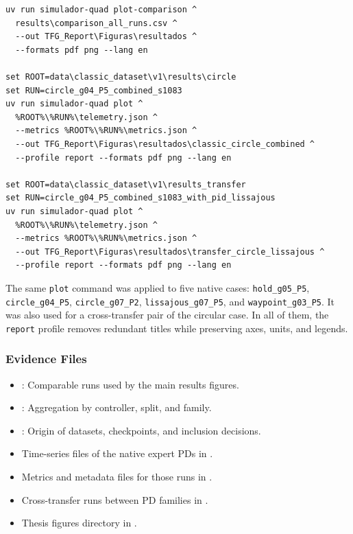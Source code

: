 \begin{verbatim}
uv run simulador-quad plot-comparison ^
  results\comparison_all_runs.csv ^
  --out TFG_Report\Figuras\resultados ^
  --formats pdf png --lang en

set ROOT=data\classic_dataset\v1\results\circle
set RUN=circle_g04_P5_combined_s1083
uv run simulador-quad plot ^
  %ROOT%\%RUN%\telemetry.json ^
  --metrics %ROOT%\%RUN%\metrics.json ^
  --out TFG_Report\Figuras\resultados\classic_circle_combined ^
  --profile report --formats pdf png --lang en

set ROOT=data\classic_dataset\v1\results_transfer
set RUN=circle_g04_P5_combined_s1083_with_pid_lissajous
uv run simulador-quad plot ^
  %ROOT%\%RUN%\telemetry.json ^
  --metrics %ROOT%\%RUN%\metrics.json ^
  --out TFG_Report\Figuras\resultados\transfer_circle_lissajous ^
  --profile report --formats pdf png --lang en
\end{verbatim}

The same \texttt{plot} command was applied to five native cases: \texttt{hold\_g05\_P5}, \texttt{circle\_g04\_P5}, \texttt{circle\_g07\_P2}, \texttt{lissajous\_g07\_P5}, and \texttt{waypoint\_g03\_P5}. It was also used for a cross-transfer pair of the circular case. In all of them, the \texttt{report} profile removes redundant titles while preserving axes, units, and legends.

\subsubsection*{Evidence Files}

\begin{itemize}
  \item {}: Comparable runs used by the main results figures.
  \item {}: Aggregation by controller, split, and family.
  \item {}: Origin of datasets, checkpoints, and inclusion decisions.
  \item Time-series files of the native expert PDs in .
  \item Metrics and metadata files for those runs in .
  \item Cross-transfer runs between PD families in .
  \item Thesis figures directory in .
\end{itemize}

